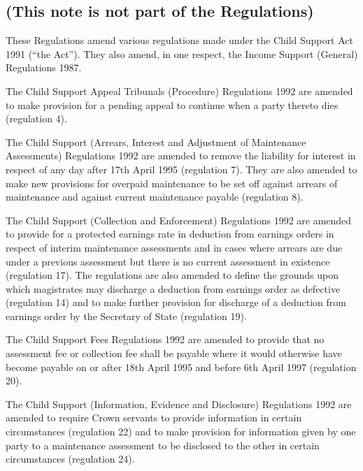 \documentclass[12pt,a4paper]{article}
\begin{document}
\renewcommand\parthead{--- Explanatory Note}

\subsection*{(This note is not part of the Regulations)}

These Regulations amend various regulations made under the Child Support Act 1991 (“the Act”). They also amend, in one respect, the Income Support (General) Regulations 1987.

  The Child Support Appeal Tribunals (Procedure) Regulations 1992 are amended to make provision for a pending appeal to continue when a party thereto dies (regulation 4).

  The Child Support (Arrears, Interest and Adjustment of Maintenance Assessments) Regulations 1992 are amended to remove the liability for interest in respect of any day after 17th April 1995 (regulation 7). They are also amended to make new provisions for overpaid maintenance to be set off against arrears of maintenance and against current maintenance payable (regulation 8).

\begin{sloppypar}
  The Child Support (Collection and Enforcement) Regulations 1992 are amended to provide for a protected earnings rate in deduction from earnings orders in respect of interim maintenance assessments and in cases where arrears are due under a previous assessment but there is no current assessment in existence (regulation 17). The regulations are also amended to define the grounds upon which magistrates may discharge a deduction from earnings order as defective (regulation 14) and to make further provision for discharge of a deduction from earnings order by the Secretary of State (regulation 19).
\end{sloppypar}

  The Child Support Fees Regulations 1992 are amended to provide that no assessment fee or collection fee shall be payable where it would otherwise have become payable on or after 18th April 1995 and before 6th April 1997 (regulation 20).

  The Child Support (Information, Evidence and Disclosure) Regulations 1992 are amended to require Crown servants to provide information in certain circumstances (regulation 22) and to make provision for information given by one party to a maintenance assessment to be disclosed to the other in certain circumstances (regulation 24).
\end{document}
